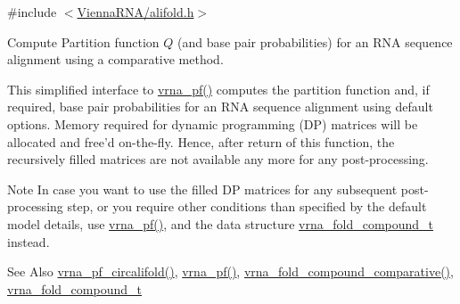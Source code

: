 {\ttfamily \#include $<$\hyperlink{alifold_8h}{Vienna\-R\-N\-A/alifold.\-h}$>$}



Compute Partition function $Q$ (and base pair probabilities) for an R\-N\-A sequence alignment using a comparative method. 

This simplified interface to \hyperlink{group__pf__fold_ga29e256d688ad221b78d37f427e0e99bc}{vrna\-\_\-pf()} computes the partition function and, if required, base pair probabilities for an R\-N\-A sequence alignment using default options. Memory required for dynamic programming (D\-P) matrices will be allocated and free'd on-\/the-\/fly. Hence, after return of this function, the recursively filled matrices are not available any more for any post-\/processing.

\begin{DoxyNote}{Note}
In case you want to use the filled D\-P matrices for any subsequent post-\/processing step, or you require other conditions than specified by the default model details, use \hyperlink{group__pf__fold_ga29e256d688ad221b78d37f427e0e99bc}{vrna\-\_\-pf()}, and the data structure \hyperlink{group__fold__compound_ga1b0cef17fd40466cef5968eaeeff6166}{vrna\-\_\-fold\-\_\-compound\-\_\-t} instead.
\end{DoxyNote}
\begin{DoxySeeAlso}{See Also}
\hyperlink{group__consensus__pf__fold_ga017209394a4c1e68d96cd47e61d16d25}{vrna\-\_\-pf\-\_\-circalifold()}, \hyperlink{group__pf__fold_ga29e256d688ad221b78d37f427e0e99bc}{vrna\-\_\-pf()}, \hyperlink{group__fold__compound_gad6bacc816af274922b13d947f708aa0c}{vrna\-\_\-fold\-\_\-compound\-\_\-comparative()}, \hyperlink{group__fold__compound_ga1b0cef17fd40466cef5968eaeeff6166}{vrna\-\_\-fold\-\_\-compound\-\_\-t}
\end{DoxySeeAlso}

